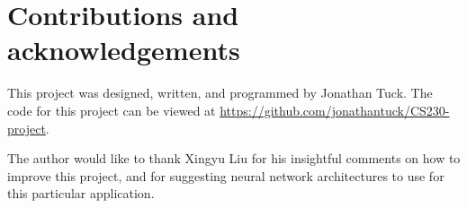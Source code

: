 \documentclass[12pt]{article}
\begin{document}
\section{Contributions and acknowledgements}
This project was designed, written, and programmed by Jonathan Tuck. The code for this project can be viewed at 
\url{https://github.com/jonathantuck/CS230-project}.

The author would like to thank Xingyu Liu for his insightful comments on how to improve this project, and for suggesting 
neural network architectures to use for this particular application.

\newpage

\end{document}
